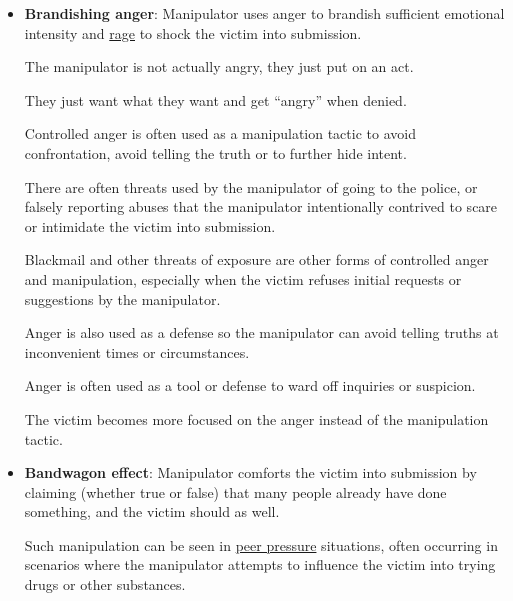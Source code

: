 \documentclass{book}
\numberwithin{equation}{section}
\begin{document}
\begin{itemize}
    The manipulator intentionally confuses the victim in order for the victim to doubt their own accuracy of perception, often pointing out key elements that the manipulator intentionally included in case there is room for doubt.
    
    Sometimes manipulators will have used cohorts in advance to help back up their story.
    \item \textbf{Brandishing anger}: Manipulator uses anger to brandish sufficient emotional intensity and \href{https://en.wikipedia.org/wiki/Rage_(emotion)}{rage} to shock the victim into submission.
    
    The manipulator is not actually angry, they just put on an act.
    
    They just want what they want and get ``angry'' when denied.
    
    Controlled anger is often used as a manipulation tactic to avoid confrontation, avoid telling the truth or to further hide intent.
    
    There are often threats used by the manipulator of going to the police, or falsely reporting abuses that the manipulator intentionally contrived to scare or intimidate the victim into submission.
    
    Blackmail and other threats of exposure are other forms of controlled anger and manipulation, especially when the victim refuses initial requests or suggestions by the manipulator.
    
    Anger is also used as a defense so the manipulator can avoid telling truths at inconvenient times or circumstances.
    
    Anger is often used as a tool or defense to ward off inquiries or suspicion.
    
    The victim becomes more focused on the anger instead of the manipulation tactic.
    \item \textbf{Bandwagon effect}: Manipulator comforts the victim into submission by claiming (whether true or false) that many people already have done something, and the victim should as well.
    
    Such manipulation can be seen in \href{https://en.wikipedia.org/wiki/Peer_pressure}{peer pressure} situations, often occurring in scenarios where the manipulator attempts to influence the victim into trying drugs or other substances.
\end{itemize}
\end{document}
